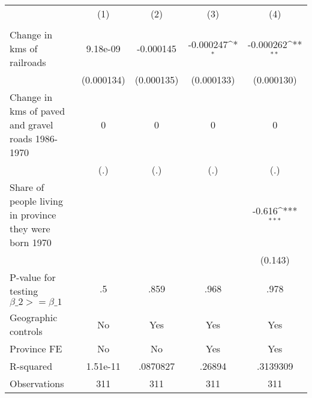 {
\def\sym#1{\ifmmode^{#1}\else\(^{#1}\)\fi}
\begin{tabular}{l*{4}{c}}
\hline\hline
                &\multicolumn{1}{c}{(1)}&\multicolumn{1}{c}{(2)}&\multicolumn{1}{c}{(3)}&\multicolumn{1}{c}{(4)}\\
                &\multicolumn{1}{c}{}&\multicolumn{1}{c}{}&\multicolumn{1}{c}{}&\multicolumn{1}{c}{}\\
\hline
Change in kms of railroads& 9.18e-09         &-0.000145         &-0.000247\sym{*}  &-0.000262\sym{**} \\
                &(0.000134)         &(0.000135)         &(0.000133)         &(0.000130)         \\
[1em]
Change in kms of paved and gravel roads 1986-1970&        0         &        0         &        0         &        0         \\
                &      (.)         &      (.)         &      (.)         &      (.)         \\
[1em]
Share of people living in province they were born 1970&                  &                  &                  &   -0.616\sym{***}\\
                &                  &                  &                  &  (0.143)         \\
\hline
P-value for testing $\beta\_{2} >= \beta\_{1}$&       .5         &     .859         &     .968         &     .978         \\
Geographic controls&       No         &      Yes         &      Yes         &      Yes         \\
Province FE     &       No         &       No         &      Yes         &      Yes         \\
R-squared       & 1.51e-11         & .0870827         &   .26894         & .3139309         \\
Observations    &      311         &      311         &      311         &      311         \\
\hline\hline
\end{tabular}
}
